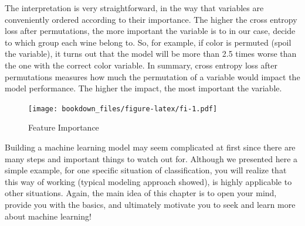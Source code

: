 \documentclass[
]{krantz}
\makeatletter
\newenvironment{Shaded}{\begin{snugshade}}{\end{snugshade}}
\newcommand{\AttributeTok}[1]{\textcolor[rgb]{0.61,0.61,0.61}{#1}}
\newcommand{\FunctionTok}[1]{\textcolor[rgb]{0,0,0}{#1}}
\newcommand{\NormalTok}[1]{#1}
\newcommand{\OtherTok}[1]{\textcolor[rgb]{0.37,0.37,0.37}{#1}}
\newcommand{\SpecialCharTok}[1]{\textcolor[rgb]{0,0,0}{#1}}
\newcommand{\StringTok}[1]{\textcolor[rgb]{0.5,0.5,0.5}{#1}}
\newenvironment{kframe}{%
\medskip{}
\setlength{\fboxsep}{.8em}
 \def\at@end@of@kframe{}%
 \ifinner\ifhmode%
  \def\at@end@of@kframe{\end{minipage}}%
  \begin{minipage}{\columnwidth}%
 \fi\fi%
 \def\FrameCommand##1{\hskip\@totalleftmargin \hskip-\fboxsep
 \colorbox{shadecolor}{##1}\hskip-\fboxsep
     \hskip-\linewidth \hskip-\@totalleftmargin \hskip\columnwidth}%
 \MakeFramed {\advance\hsize-\width
   \@totalleftmargin\z@ \linewidth\hsize
   \@setminipage}}%
 {\par\unskip\endMakeFramed%
 \at@end@of@kframe}
\renewenvironment{Shaded}{\begin{kframe}}{\end{kframe}}
\makeatother
\begin{document}
The interpretation is very straightforward, in the way that variables are conveniently ordered according to their importance. The higher the cross entropy loss after permutations, the more important the variable is to in our case, decide to which group each wine belong to. So, for example, if color is permuted (spoil the variable), it turns out that the model will be more than 2.5 times worse than the one with the correct color variable. In summary, cross entropy loss after permutations measures how much the permutation of a variable would impact the model performance. The higher the impact, the most important the variable.

\begin{Shaded}
\end{Shaded}

\begin{figure}
\centering
\texttt{[image: bookdown\_files/figure-latex/fi-1.pdf]}
\caption{\label{fig:fi}Feature Importance}
\end{figure}

Building a machine learning model may seem complicated at first since there are many steps and important things to watch out for. Although we presented here a simple example, for one specific situation of classification, you will realize that this way of working (typical modeling approach showed), is highly applicable to other situations. Again, the main idea of this chapter is to open your mind, provide you with the basics, and ultimately motivate you to seek and learn more about machine learning!
\end{document}
